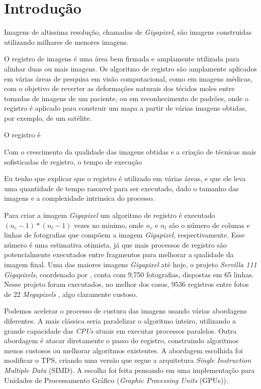 \chapter{Introdução}
\label{cap:introducao}

	Imagens de altissima resolução, chamadas de \textit{Gigapixel}, são imagens construidas utilizando milhares de 
menores imagens. 

	O registro de imagens é uma área bem firmada e amplamente utilizada para alinhar duas ou mais imagens. Os algoritmo 
de registro são amplamente aplicados em várias áreas de pesquisa em visão computacional, como em imagens médicas, com o 
objetivo de reverter as deformações naturais dos técidos moles entre tomadas de imagens de um paciente, ou em 
reconhecimento de padrões, onde o registro é aplicado para construir um mapa a partir de várias imagens 
obtidas, por exemplo, de um satélite.

	O registro é

	Com o crescimento da qualidade das imagens obtidas e a criação de técnicas mais sofisticadas de registro,
o tempo de execução 



Eu tenho que explicar que o registro é utilizado em várias áreas, e que ele leva uma quantidade de tempo
rasoavel para ser executado, dado o tamanho das imagens e a complexidade intrinsica do processo.


    Para criar a imagem \textit{Gigapixel} um algoritmo de registro é executado $(n_c-1)*(n_l-1)$ vezes no minimo, 
onde $n_c$ e $n_l$ são o número de colunas e linhas de fotografias que compõem a imagem \textit{Gigapixel}, 
respectivamente. Esse número é uma estimativa otimista, já que mais processos de registro são potencialmente executados
entre fragmentos para melhorar a qualidade da imagem final. Uma das maiores imagens \textit{Gigapixel} até hoje, 
o projeto \textit{Servilla 111 Gigapixels}, coordenado por \cite{sevilla111},  conta com 9,750 fotografias, dispostas
em 65 linhas. Nesse projeto foram executados, no melhor dos casos, 9536 registros entre fotos de 22 \textit{Megapixels}
, algo claramente custoso.

    Podemos acelerar o processo de custura das imagens usando várias abordagens diferentes. A mais clássica seria
paralelizar o algoritmo inteiro, utilizando a grande capacidade das \textit{CPUs} atuais em executar processos paralelos.
Outra abordagem é atacar diretamente o passo do registro, construindo algoritmos menos custosos ou melhorar algoritmos
existentes. A abordagem escolhida foi modificar o TPS, criando uma versão que segue a arquitetura 
\textit{Single Instruction Multiple Data} (SIMD). A escolha foi feita pensando em uma implementação para 
Unidades de Processamento Gráfico (\textit{Graphic Processing Units} (GPUs)).



